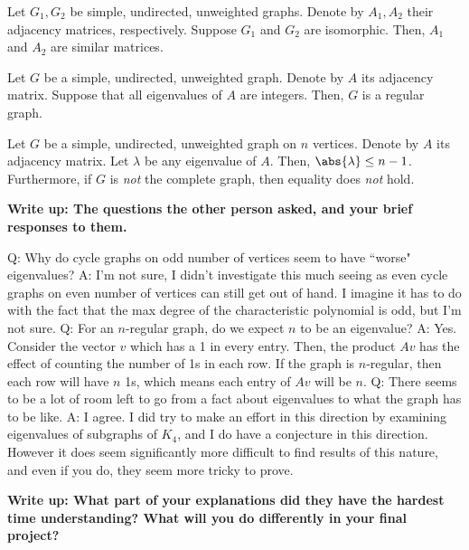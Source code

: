 \documentclass{article}
\begin{document}

\begin{thm}
Let $ G_{1}, G_{2} $ be simple, undirected, unweighted graphs.
Denote by $ A_{1}, A_{2} $ their adjacency matrices, respectively. \vsp
Suppose $ G_{1} $ and $ G_{2} $ are isomorphic. Then, $ A_{1} $ and $ A_{2} $ are similar matrices.
\end{thm}



\begin{thm}
Let $ G $ be a simple, undirected, unweighted graph.
Denote by $ A $ its adjacency matrix. \vsp
Suppose that all eigenvalues of $ A $ are integers. Then, $ G $ is a regular graph.
\end{thm}



\begin{thm}
Let $ G $ be a simple, undirected, unweighted graph on $ n $ vertices.
Denote by $ A $ its adjacency matrix. \vsp
Let $ \lambda $ be any eigenvalue of $ A $. Then, $ \abs{\lambda} \leq n - 1 $.
Furthermore, if $ G $ is \textit{not} the complete graph, then equality does \textit{not} hold.
\end{thm}

\newpage
\textbf{Write up: The questions the other person asked, and your brief responses to them.} \npgh

Q: Why do cycle graphs on odd number of vertices seem to have ``worse" eigenvalues? \vsp
A: I'm not sure, I didn't investigate this much seeing as even cycle graphs on even number of vertices can still get out of hand.
I imagine it has to do with the fact that the max degree of the characteristic polynomial is odd, but I'm not sure. \vsp
Q: For an $ n $-regular graph, do we expect $ n $ to be an eigenvalue? \vsp
A: Yes. Consider the vector $ v $ which has a 1 in every entry. Then, the product $ Av $ has the effect of counting the number of 1s in each row.
If the graph is $ n $-regular, then each row will have $ n $ 1s, which means each entry of $ Av $ will be $ n $. \vsp
Q: There seems to be a lot of room left to go from a fact about eigenvalues to what the graph has to be like. \vsp
A: I agree. I did try to make an effort in this direction by examining eigenvalues of subgraphs of $ K_{4} $, and I do have a conjecture in this direction.
However it does seem significantly more difficult to find results of this nature, and even if you do, they seem more tricky to prove.

\newpage
\textbf{Write up: What part of your explanations did they have the hardest time understanding? What will you do differently in your final project?} \npgh
\end{document}
